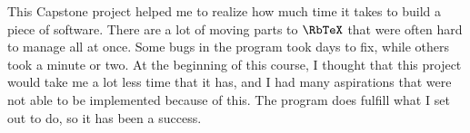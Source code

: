 \documentclass[11pt]{article}
\begin{document}
This Capstone project helped me to realize how much time it takes to build a piece of software. There are a lot of moving parts to $\RbTeX$ that were often hard to manage all at once. Some bugs in the program took days to fix, while others took a minute or two. At the beginning of this course, I thought that this project would take me a lot less time that it has, and I had many aspirations that were not able to be implemented because of this. The program does fulfill what I set out to do, so it has been a success.
\end{document}
